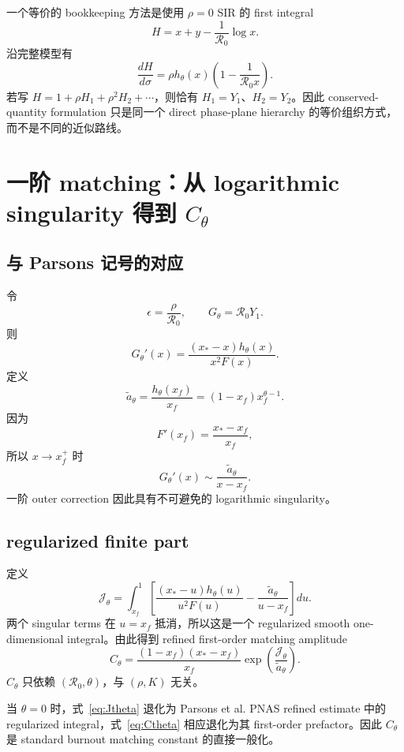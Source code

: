 \documentclass[11pt,a4paper]{ctexart}
\newcommand{\Rzero}{\mathcal R_0}
\newcommand{\Jfun}{\mathcal J_\theta}
\newcommand{\Cfun}{C_\theta}
\newcommand{\xf}{x_f}
\newcommand{\xs}{x_*}
\begin{document}
一个等价的 bookkeeping 方法是使用 $\rho=0$ SIR 的 first integral
\[
H=x+y-\frac1{\Rzero}\log x.
\]
沿完整模型有
\[
\frac{dH}{d\sigma}
=\rho h_\theta(x)\left(1-\frac1{\Rzero x}\right).
\]
若写 $H=1+\rho H_1+\rho^2H_2+\cdots$，则恰有 $H_1=Y_1$、$H_2=Y_2$。因此 conserved-quantity formulation 只是同一个 direct phase-plane hierarchy 的等价组织方式，而不是不同的近似路线。

\section{一阶 matching：从 logarithmic singularity 得到 $C_\theta$}
\subsection{与 Parsons 记号的对应}
令
\[
\epsilon=\frac\rho{\Rzero},
\qquad
G_\theta=\Rzero Y_1.
\]
则
\begin{equation}
\label{eq:Gprime}
G_\theta'(x)
=\frac{(\xs-x)h_\theta(x)}{x^2F(x)}.
\end{equation}
定义
\begin{equation}
\label{eq:atilde}
\widetilde a_\theta
=\frac{h_\theta(\xf)}{\xf}
=(1-\xf)\xf^{\theta-1}.
\end{equation}
因为
\[
F'(\xf)=\frac{\xs-\xf}{\xf},
\]
所以 $x\to\xf^+$ 时
\[
G_\theta'(x)\sim\frac{\widetilde a_\theta}{x-\xf}.
\]
一阶 outer correction 因此具有不可避免的 logarithmic singularity。

\subsection{regularized finite part}
定义
\begin{equation}
\label{eq:Jtheta}
\Jfun
=\int_{\xf}^{1}
\left[
\frac{(\xs-u)h_\theta(u)}{u^2F(u)}
-\frac{\widetilde a_\theta}{u-\xf}
\right]du.
\end{equation}
两个 singular terms 在 $u=\xf$ 抵消，所以这是一个 regularized smooth one-dimensional integral。由此得到 refined first-order matching amplitude
\begin{equation}
\label{eq:Ctheta}
\Cfun
=\frac{(1-\xf)(\xs-\xf)}{\xf}
\exp\!\left(\frac{\Jfun}{\widetilde a_\theta}\right).
\end{equation}
$C_\theta$ 只依赖 $(\Rzero,\theta)$，与 $(\rho,K)$ 无关。

当 $\theta=0$ 时，式~\eqref{eq:Jtheta} 退化为 Parsons et al. PNAS refined estimate 中的 regularized integral，式~\eqref{eq:Ctheta} 相应退化为其 first-order prefactor\cite{PNAS2024}。因此 $C_\theta$ 是 standard burnout matching constant 的直接一般化。
\end{document}
